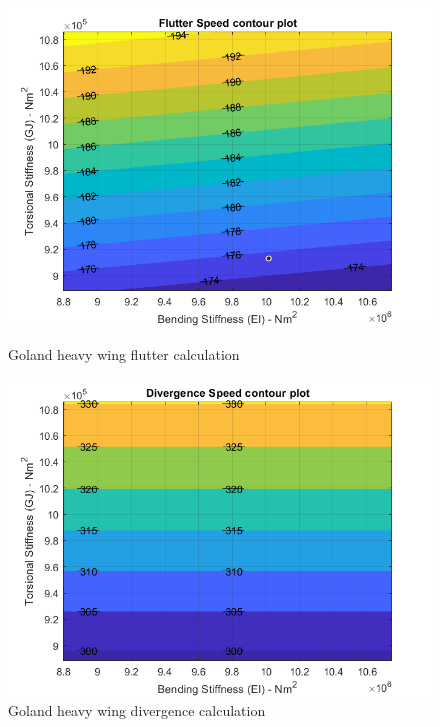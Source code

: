 \documentclass[11pt]{article}
\begin{document}
\begin{figure}[!hbt]
    \begin{minipage}{.5\textwidth}
    \centering
    \includegraphics[width = \textwidth]{figures/Goland_fixed_flutter.png}
    \caption{Goland heavy wing flutter calculation}
    \label{fig:Goland-flutter}
    \end{minipage}%
    \begin{minipage}{.5\textwidth}
    \centering
    \includegraphics[width = \textwidth]{figures/Goland_fixed_divergence.png}
    \caption{Goland heavy wing divergence calculation}
    \label{fig:Goland-div}
    \end{minipage}
\end{figure}
\end{document}
